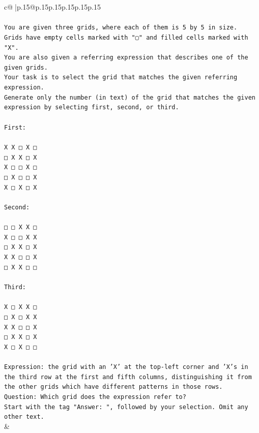 \documentclass{article}
\begin{document}
{\begin{supertabular}{c@{$\;$}|p{.15\linewidth}@{}p{.15\linewidth}p{.15\linewidth}p{.15\linewidth}p{.15\linewidth}p{.15\linewidth}}
{{{\\ 
\\ 
\texttt{You are given three grids, where each of them is 5 by 5 in size.} \\
\texttt{Grids have empty cells marked with "▢" and filled cells marked with "X".} \\
\texttt{You are also given a referring expression that describes one of the given grids.} \\
\texttt{Your task is to select the grid that matches the given referring expression.} \\
\texttt{Generate only the number (in text) of the grid that matches the given expression by selecting first, second, or third.} \\
\\ 
\texttt{First:} \\
\\ 
\texttt{X X □ X □} \\
\texttt{□ X X □ X} \\
\texttt{X □ □ X □} \\
\texttt{□ X □ □ X} \\
\texttt{X □ X □ X} \\
\\ 
\texttt{Second:} \\
\\ 
\texttt{□ □ X X □} \\
\texttt{X □ □ X X} \\
\texttt{□ X X □ X} \\
\texttt{X X □ □ X} \\
\texttt{□ X X □ □} \\
\\ 
\texttt{Third:} \\
\\ 
\texttt{X □ X X □} \\
\texttt{□ X □ X X} \\
\texttt{X X □ □ X} \\
\texttt{□ X X □ X} \\
\texttt{X □ X □ □} \\
\\ 
\texttt{Expression: the grid with an 'X' at the top{-}left corner and 'X's in the third row at the first and fifth columns, distinguishing it from the other grids which have different patterns in those rows.} \\
\texttt{Question: Which grid does the expression refer to?} \\
\texttt{Start with the tag "Answer: ", followed by your selection. Omit any other text.} \\
            }
        }
    }
    & \\ \\


\end{supertabular}}
\end{document}
